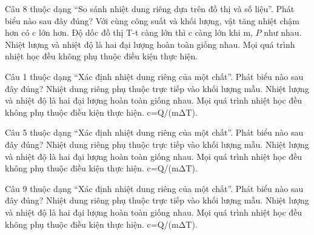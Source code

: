\begin{ex}
Câu 8 thuộc dạng “So sánh nhiệt dung riêng dựa trên đồ thị và số liệu”. Phát biểu nào sau đây đúng?
\choice
{\True Với cùng công suất và khối lượng, vật tăng nhiệt chậm hơn có c lớn hơn.}
{Độ dốc đồ thị T-t càng lớn thì c càng lớn khi m, $P$ như nhau.}
{Nhiệt lượng và nhiệt độ là hai đại lượng hoàn toàn giống nhau.}
{Mọi quá trình nhiệt học đều không phụ thuộc điều kiện thực hiện.}
\end{ex}

\begin{ex}
Câu 1 thuộc dạng “Xác định nhiệt dung riêng của một chất”. Phát biểu nào sau đây đúng?
\choice
{Nhiệt dung riêng phụ thuộc trực tiếp vào khối lượng mẫu.}
{Nhiệt lượng và nhiệt độ là hai đại lượng hoàn toàn giống nhau.}
{Mọi quá trình nhiệt học đều không phụ thuộc điều kiện thực hiện.}
{\True c=Q/(mΔT).}
\end{ex}

\begin{ex}
Câu 5 thuộc dạng “Xác định nhiệt dung riêng của một chất”. Phát biểu nào sau đây đúng?
\choice
{Nhiệt dung riêng phụ thuộc trực tiếp vào khối lượng mẫu.}
{Nhiệt lượng và nhiệt độ là hai đại lượng hoàn toàn giống nhau.}
{Mọi quá trình nhiệt học đều không phụ thuộc điều kiện thực hiện.}
{\True c=Q/(mΔT).}
\end{ex}

\begin{ex}
Câu 9 thuộc dạng “Xác định nhiệt dung riêng của một chất”. Phát biểu nào sau đây đúng?
\choice
{Nhiệt dung riêng phụ thuộc trực tiếp vào khối lượng mẫu.}
{Nhiệt lượng và nhiệt độ là hai đại lượng hoàn toàn giống nhau.}
{Mọi quá trình nhiệt học đều không phụ thuộc điều kiện thực hiện.}
{\True c=Q/(mΔT).}
\end{ex}

